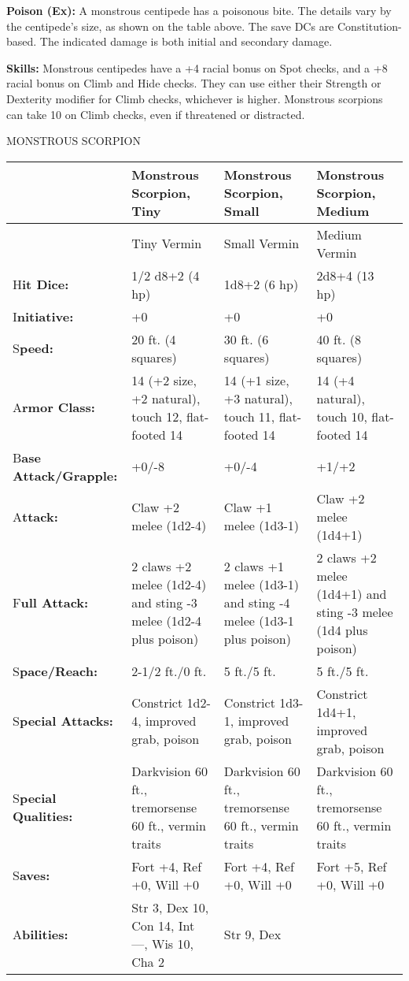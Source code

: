 \documentclass{article}
\begin{document}
\textbf{Poison (Ex): }A monstrous centipede has a poisonous bite. The details vary 
by the centipede's size, as shown on the table above. The save DCs are Constitution-based. 
The indicated damage is both initial and secondary damage. 

\textbf{Skills:} Monstrous centipedes have a +4 racial bonus on Spot checks, and 
a +8 racial bonus on Climb and Hide checks. They can use either their Strength 
or Dexterity modifier for Climb checks, whichever is higher. Monstrous scorpions 
can take 10 on Climb checks, even if threatened or distracted.

\vspace{12pt}
MONSTROUS SCORPION

\begin{tabular}{|>{\raggedright}p{52pt}|>{\raggedright}p{84pt}|>{\raggedright}p{84pt}|>{\raggedright}p{81pt}|}
\hline
  & M\textbf{onstrous Scorpion, Tiny} & M\textbf{onstrous Scorpion, Small} & M\textbf{onstrous 
Scorpion, Medium}\tabularnewline
\hline
  & Tiny Vermin & Small Vermin & Medium Vermin\tabularnewline
\hline
H\textbf{it Dice:} & 1/2 d8+2 (4 hp) & 1d8+2 (6 hp) & 2d8+4 (13 hp)\tabularnewline
\hline
I\textbf{nitiative:} & +0 & +0 & +0\tabularnewline
\hline
S\textbf{peed:} & 20 ft. (4 squares) & 30 ft. (6 squares) & 40 ft. (8 squares)\tabularnewline
\hline
A\textbf{rmor Class:} & 14 (+2 size, +2 natural), touch 12, flat-footed 14 & 14 
(+1 size, +3 natural), touch 11, flat-footed 14 & 14 (+4 natural), touch 10, flat-footed 
14\tabularnewline
\hline
B\textbf{ase Attack/Grapple:} & +0/-8 & +0/-4 & +1/+2\tabularnewline
\hline
A\textbf{ttack:} & Claw +2 melee (1d2-4) & Claw +1 melee (1d3-1) & Claw +2 melee 
(1d4+1)\tabularnewline
\hline
F\textbf{ull Attack:} & 2 claws +2 melee (1d2-4) and sting -3 melee (1d2-4 plus 
poison) & 2 claws +1 melee (1d3-1) and sting -4 melee (1d3-1 plus poison) & 2 claws 
+2 melee (1d4+1) and sting -3 melee (1d4 plus poison)\tabularnewline
\hline
S\textbf{pace/Reach:} & 2-1/2 ft./0 ft. & 5 ft./5 ft. & 5 ft./5 ft.\tabularnewline
\hline
S\textbf{pecial Attacks:} & Constrict 1d2-4, improved grab, poison & Constrict 
1d3-1, improved grab, poison & Constrict 1d4+1, improved grab, poison\tabularnewline
\hline
S\textbf{pecial Qualities:} & Darkvision 60 ft., tremorsense 60 ft., vermin traits & Darkvision 
60 ft., tremorsense 60 ft., vermin traits & Darkvision 60 ft., tremorsense 60 ft., 
vermin traits\tabularnewline
\hline
S\textbf{aves:} & Fort +4, Ref +0, Will +0 & Fort +4, Ref +0, Will +0 & Fort +5, 
Ref +0, Will +0\tabularnewline
\hline
A\textbf{bilities:} & Str 3, Dex 10, Con 14, Int ---, Wis 10, Cha 2 & Str 9, Dex 

\end{tabular}
\end{document}
